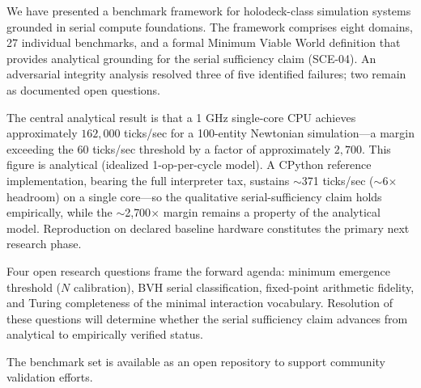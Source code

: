 \documentclass[conference]{IEEEtran}
\begin{document}
We have presented a benchmark framework for holodeck-class simulation systems
grounded in serial compute foundations. The framework comprises eight domains,
27 individual benchmarks, and a formal Minimum Viable World definition that
provides analytical grounding for the serial sufficiency claim (SCE-04). An
adversarial integrity analysis resolved three of five identified failures;
two remain as documented open questions.

The central analytical result is that a 1 GHz single-core CPU achieves
approximately $162{,}000$ ticks/sec for a 100-entity Newtonian simulation---a
margin exceeding the 60 ticks/sec threshold by a factor of approximately $2{,}700$.
This figure is analytical (idealized 1-op-per-cycle model). A CPython reference
implementation, bearing the full interpreter tax, sustains $\sim$371 ticks/sec
($\sim$6$\times$ headroom) on a single core---so the qualitative serial-sufficiency
claim holds empirically, while the $\sim$2{,}700$\times$ margin remains a property
of the analytical model. Reproduction on declared baseline hardware constitutes
the primary next research phase.

Four open research questions frame the forward agenda: minimum emergence threshold
($N$ calibration), BVH serial classification, fixed-point arithmetic fidelity, and
Turing completeness of the minimal interaction vocabulary. Resolution of these
questions will determine whether the serial sufficiency claim advances from
analytical to empirically verified status.

The benchmark set is available as an open repository to support community validation
efforts.



\end{document}
